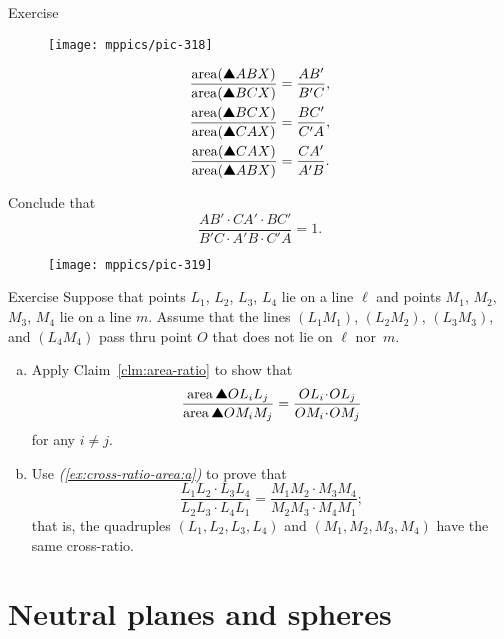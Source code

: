 {\begin{thm}{Exercise}
\vskip-3mm

{

\begin{wrapfigure}[6]{r}{40 mm}
\vskip4mm
\centering
\texttt{[image: mppics/pic-318]}
\end{wrapfigure}

\begin{align*}
\frac{\area(\solidtriangle ABX)}{\area(\solidtriangle BCX)}&=\frac{AB'}{B'C},
\\
\frac{\area(\solidtriangle BCX)}{\area(\solidtriangle CAX)}&=\frac{BC'}{C'A},
\\
\frac{\area(\solidtriangle CAX)}{\area(\solidtriangle ABX)}&=\frac{CA'}{A'B} .
\end{align*}

}

Conclude that 
\[\frac{AB'\cdot CA'\cdot BC'}{B'C\cdot A'B\cdot C'A}=1.\]
\end{thm}

\begin{wrapfigure}[5]{r}{40 mm}
\vskip-6mm
\centering
\texttt{[image: mppics/pic-319]}
\end{wrapfigure}

\begin{thm}{Exercise}\label{ex:cross-ratio-area}
Suppose that points $L_1$, $L_2$, $L_3$, $L_4$ lie on a line $\ell$ 
and points $M_1$, $M_2$, $M_3$, $M_4$ lie on a line $m$. 
Assume that the lines $(L_1M_1)$, $(L_2M_2)$, $(L_3M_3)$, and $(L_4M_4)$ pass thru point $O$ that does not lie on $\ell$ nor~$m$.

\begin{enumerate}[(a)]
 \item\label{ex:cross-ratio-area:a} Apply Claim~\ref{clm:area-ratio} to show that
 \[\frac{\area\solidtriangle OL_iL_j}{\area\solidtriangle OM_iM_j}=\frac{OL_i\cdot OL_j}{OM_i\cdot OM_j}\]
 for any $i\ne j$.
 \item\label{ex:cross-ratio-area:b} Use \textit{(\ref{ex:cross-ratio-area:a})} to prove that 
 \[\frac{L_1L_2\cdot L_3L_4}{L_2L_3\cdot L_4L_1}=\frac{M_1M_2\cdot M_3M_4}{M_2M_3\cdot M_4M_1};\]
 that is, the quadruples $(L_1, L_2, L_3, L_4)$ and $(M_1, M_2, M_3, M_4)$ have the same cross-ratio.
 
\end{enumerate}

\end{thm}


\section{Neutral planes and spheres}

}
